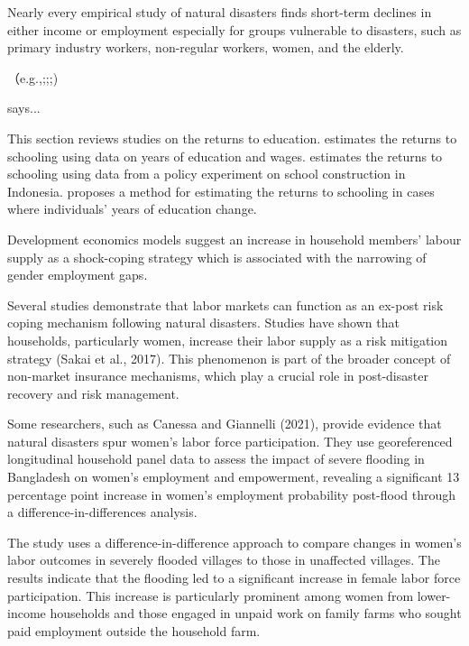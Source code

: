 \documentclass[12pt,halfline,a4paper]{ouparticle}
\begin{document}
Nearly every empirical study of natural disasters finds short-term declines in either income or employment especially for groups vulnerable to disasters, such as primary industry workers, non-regular workers, women, and the elderly.

（e.g.,\cite{};\cite{};\cite{};\cite{})

 \citet{Groger2016InternalTyphoon} says... 


This section reviews studies on the returns to education. \cite{Amei2012TimeEarthquakes} estimates the returns to schooling using data on years of education and wages. \cite{Ando2011EarthquakeView} estimates the returns to schooling using data from a policy experiment on school construction in Indonesia. \cite{Canessa2019WomensShocks} proposes a method for estimating the returns to schooling in cases where individuals' years of education change.





Development economics models suggest an increase in household members’ labour supply as a shock-coping strategy which is associated with the narrowing of gender employment gaps. 

Several studies demonstrate that labor markets can function as an ex-post risk coping mechanism following natural disasters. Studies have shown that households, particularly women, increase their labor supply as a risk mitigation strategy (Sakai et al., 2017). This phenomenon is part of the broader concept of non-market insurance mechanisms, which play a crucial role in post-disaster recovery and risk management.


Some researchers, such as Canessa and Giannelli (2021), provide evidence that natural disasters spur women's labor force participation. They use georeferenced longitudinal household panel data to assess the impact of severe flooding in Bangladesh on women’s employment and empowerment, revealing a significant 13 percentage point increase in women's employment probability post-flood through a difference-in-differences analysis.


The study uses a difference-in-difference approach to compare changes in women’s labor outcomes in severely flooded villages to those in unaffected villages. The results indicate that the flooding led to a significant increase in female labor force participation. This increase is particularly prominent among women from lower-income households and those engaged in unpaid work on family farms who sought paid employment outside the household farm.
\end{document}
